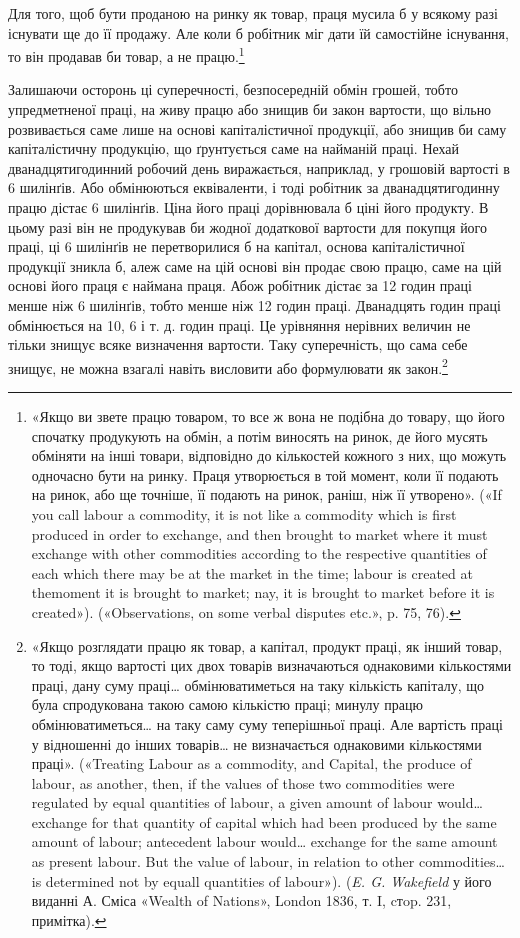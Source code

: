 Для того, щоб бути проданою на ринку як товар, праця мусила
б у всякому разі існувати ще до її продажу. Але коли б
робітник міг дати їй самостійне існування, то він продавав би
товар, а не працю.\footnote{
«Якщо ви звете працю товаром, то все ж вона не подібна до товару,
що його спочатку продукують на обмін, а потім виносять на ринок, де
його мусять обміняти на інші товари, відповідно до кількостей кожного
з них, що можуть одночасно бути на ринку. Праця утворюється в той
момент, коли її подають на ринок, або ще точніше, її подають на ринок,
раніш, ніж її утворено». («If you call labour a commodity, it is not like a
commodity which is first produced in order to exchange, and then brought
to market where it must exchange with other commodities according to the
respective quantities of each which there may be at the market in the
time; labour is created at themoment it is brought to market; nay, it is
brought to market before it is created»). («Observations, on some verbal
disputes etc.», p. 75, 76).
}

Залишаючи осторонь ці суперечності, безпосередній обмін грошей,
тобто упредметненої праці, на живу працю або знищив би
закон вартости, що вільно розвивається саме лише на основі
капіталістичної продукції, або знищив би саму капіталістичну
продукцію, що ґрунтується саме на найманій праці. Нехай дванадцятигодинний
робочий день виражається, наприклад, у грошовій
вартості в 6 шилінґів. Або обмінюються еквіваленти, і тоді
робітник за дванадцятигодинну працю дістає 6 шилінґів. Ціна
його праці дорівнювала б ціні його продукту. В цьому разі він
не продукував би жодної додаткової вартости для покупця його
праці, ці 6 шилінґів не перетворилися б на капітал, основа капіталістичної
продукції зникла б, алеж саме на цій основі він
продає свою працю, саме на цій основі його праця є наймана
праця. Абож робітник дістає за 12 годин праці менше ніж 6 шилінґів,
тобто менше ніж 12 годин праці. Дванадцять годин праці
обмінюється на 10, 6 і т. д. годин праці. Це урівняння нерівних
величин не тільки знищує всяке визначення вартости. Таку
суперечність, що сама себе знищує, не можна взагалі навіть висловити
або формулювати як закон.\footnote{
«Якщо розглядати працю як товар, а капітал, продукт праці,
як інший товар, то тоді, якщо вартості цих двох товарів визначаються
однаковими кількостями праці, дану суму праці\dots{} обмінюватиметься
на таку кількість капіталу, що була спродукована такою самою кількістю
праці; минулу працю обмінюватиметься\dots{} на таку саму суму теперішньої
праці. Але вартість праці у відношенні до інших товарів\dots{} не визначається
однаковими кількостями праці». («Treating Labour as a commodity,
and Capital, the produce of labour, as another, then, if the values
of those two commodities were regulated by equal quantities of labour,
a given amount of labour would\dots{} exchange for that quantity of capital
which had been produced by the same amount of labour; antecedent labour
would\dots{} exchange for the same amount as present labour. But the value
of labour, in relation to other commodities\dots{} is determined not by equall
quantities of labour»). (\emph{E. G. Wakefield} у його виданні А. Сміса «Wealth
of Nations», London 1836, т. I, cтop. 231, примітка).
}

